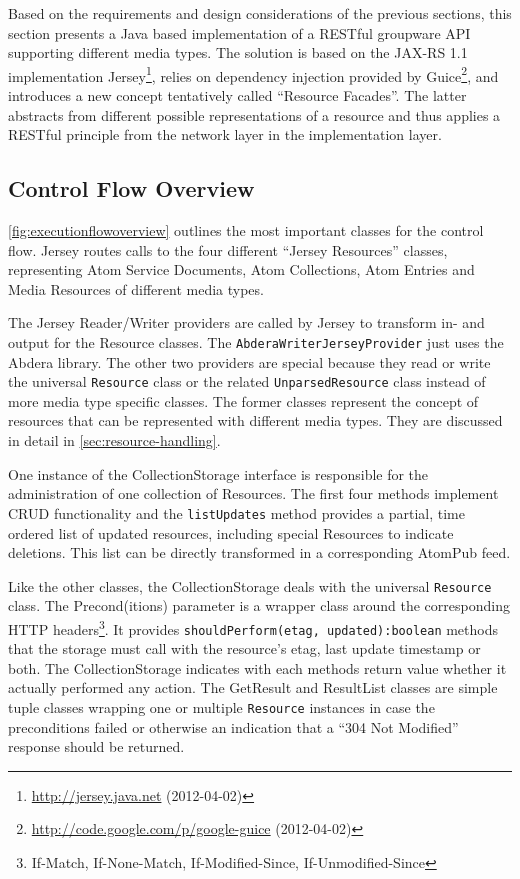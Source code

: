 \documentclass[11pt,a4paper,headsepline,twoside]{scrartcl}		%
\newcommand{\citeurl}[2]{\url{#1} (#2)}
\begin{document}
Based on the requirements and design considerations of the previous sections,
this section presents a Java based implementation of a RESTful groupware API
supporting different media types. The solution is based on the JAX-RS 1.1
\cite{JAX-RS1.1} implementation
Jersey\footnote{\citeurl{http://jersey.java.net}{2012-04-02}}, relies on
dependency injection provided by
Guice\footnote{\citeurl{http://code.google.com/p/google-guice}{2012-04-02}}, and
introduces a new concept tentatively called ``Resource Facades''. The latter
abstracts from different possible representations of a resource and thus applies
a RESTful principle from the network layer in the implementation layer.

\subsection{Control Flow Overview}
\label{sec:overview}


\autoref{fig:executionflowoverview} outlines the most important classes for the
control flow. Jersey routes calls to the four different ``Jersey Resources''
classes, representing Atom Service Documents, Atom Collections, Atom Entries and
Media Resources of different media types.

The Jersey Reader/Writer providers are called by Jersey to transform in- and
output for the Resource classes. The \lstinline:AbderaWriterJerseyProvider: just
uses the Abdera library. The other two providers are special because they read
or write the universal \lstinline:Resource: class or the related
\lstinline:UnparsedResource: class instead of more media type specific
classes. The former classes represent the concept of resources that can be
represented with different media types. They are discussed in detail in
\autoref{sec:resource-handling}.

One instance of the CollectionStorage interface is responsible for the
administration of one collection of Resources. The first four methods implement
CRUD functionality and the \lstinline:listUpdates: method provides a partial,
time ordered list of updated resources, including special Resources to indicate
deletions. This list can be directly transformed in a corresponding AtomPub
feed.

Like the other classes, the CollectionStorage deals with the universal
\lstinline:Resource: class. The Precond(itions) parameter is a wrapper class
around the corresponding HTTP headers\footnote{If-Match, If-None-Match,
  If-Modified-Since, If-Unmodified-Since}. It provides
\lstinline;shouldPerform(etag, updated):boolean; methods that the storage must
call with the resource's etag, last update timestamp or both. The
CollectionStorage indicates with each methods return value whether it actually
performed any action. The GetResult and ResultList classes are simple tuple
classes wrapping one or multiple \lstinline:Resource: instances in case the
preconditions failed or otherwise an indication that a ``304 Not Modified''
response should be returned.
\end{document}
